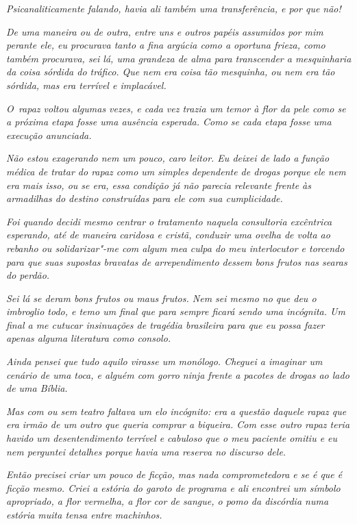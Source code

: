 \emph{Psicanaliticamente falando, havia ali também uma transferência, e
por que não!}

\emph{De uma maneira ou de outra, entre uns e outros papéis assumidos
por mim perante ele, eu procurava tanto a fina argúcia como a oportuna
frieza, como também procurava, sei lá, uma grandeza de alma para
transcender a mesquinharia da coisa sórdida do tráfico. Que nem era
coisa tão mesquinha, ou nem era tão sórdida, mas era terrível e
implacável.}~

\emph{O~rapaz voltou algumas vezes, e cada vez trazia um temor à flor da
pele como se a próxima etapa fosse uma ausência esperada. Como se cada
etapa fosse uma execução anunciada.}~

\emph{Não estou exagerando nem um pouco, caro leitor. Eu deixei de lado
a função médica de tratar do rapaz como um simples dependente de drogas
porque ele nem era mais isso, ou se era, essa condição já não parecia
relevante frente às armadilhas do destino construídas para ele com sua
cumplicidade.}~

\emph{Foi quando decidi mesmo centrar o tratamento naquela consultoria
excêntrica esperando, até de maneira caridosa e cristã, conduzir uma
ovelha de volta ao rebanho ou solidarizar"-me com algum mea culpa do meu
interlocutor e torcendo para que suas supostas bravatas de
arrependimento dessem bons frutos nas searas do perdão.}

\emph{Sei lá se deram bons frutos ou maus frutos. Nem sei mesmo no que
deu o imbroglio todo, e temo um final que para sempre ficará sendo uma
incógnita. Um final a me cutucar insinuações de tragédia brasileira para
que eu possa fazer apenas alguma literatura como consolo.}~

\emph{Ainda pensei que tudo aquilo virasse um monólogo. Cheguei a
imaginar um cenário de uma toca, e alguém com gorro ninja frente a
pacotes de drogas ao lado de uma Bíblia.}~

\emph{Mas com ou sem teatro faltava um elo incógnito: era a questão
daquele rapaz que era irmão de um outro que queria comprar a biqueira.
Com esse outro rapaz teria havido um desentendimento terrível e cabuloso
que o meu paciente omitiu e eu nem perguntei detalhes porque havia uma
reserva no discurso dele.}~

\emph{Então precisei criar um pouco de ficção, mas nada comprometedora e
se é que é ficção mesmo. Criei a estória do garoto de programa e ali
encontrei um símbolo apropriado, a flor vermelha, a flor cor de sangue,
o pomo da discórdia numa estória muita tensa entre machinhos.}~

